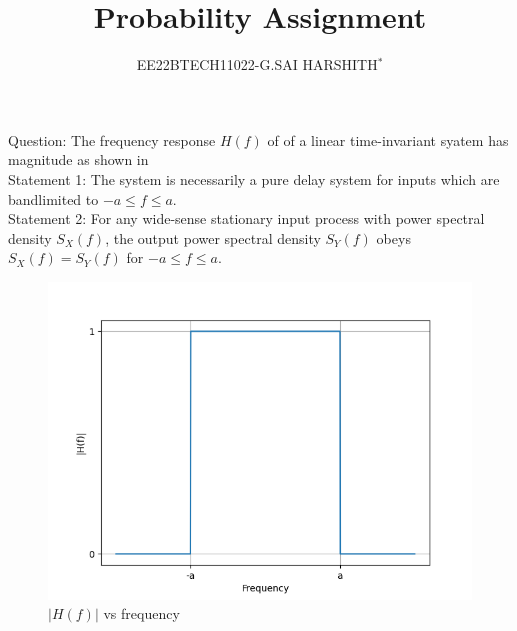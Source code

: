 \documentclass[journal,12pt,twocolumn]{IEEEtran}
\theoremstyle{remark}
\begin{document}

\vspace{3cm}

\title{Probability Assignment}
\author{EE22BTECH11022-G.SAI HARSHITH$^{*}$%
}
\maketitle
\newpage
\bigskip
\renewcommand{\thefigure}{\theenumi}
\renewcommand{\thetable}{\theenumi}

Question: The frequency response $H(f)$ of of a linear time-invariant syatem has magnitude as shown in \\
Statement 1: The system is necessarily a pure delay system for inputs which are bandlimited to $-a \leq f \leq a$.\\
Statement 2: For any wide-sense stationary input process with power spectral density $S_X(f)$, the output power spectral density $S_Y(f)$ obeys $S_X(f)=S_Y(f)$ for $-a \leq f \leq a$.\\
\begin{figure}[!ht]
\centering
\includegraphics[width=\columnwidth]{figs/figure.png}
\caption{$|H(f)|$ vs frequency}
\label{fig:11}
\end{figure}
\solution
\end{document}
